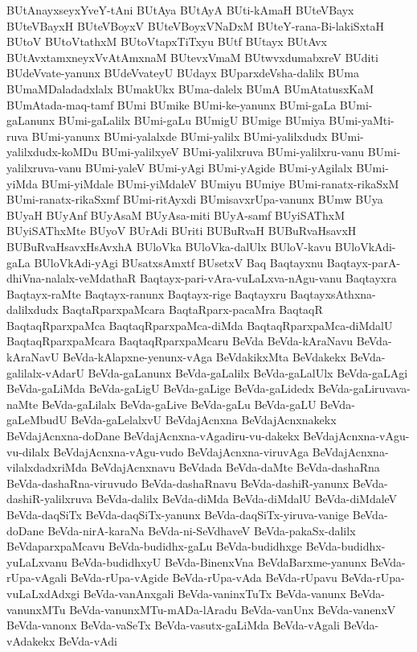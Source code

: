 {BUtAnayxseyxYveY-tAni
BUtAya
BUtAyA
BUti-kAmaH
BUteVBayx
BUteVBayxH
BUteVBoyxV
BUteVBoyxVNaDxM
BUteY-rana-Bi-lakiSxtaH
BUtoV
BUtoVtathxM
BUtoVtapxTiTxyu
BUtf
BUtayx
BUtAvx
BUtAvxtamxneyxVvAtAmxnaM
BUtevxVmaM
BUtwvxdumabxreV
BUditi
BUdeVvate-yanunx
BUdeVvateyU
BUdayx
BUparxdeVsha-dalilx
BUma
BUmaMDaladadxlalx
BUmakUkx
BUma-dalelx
BUmA
BUmAtatusxKaM
BUmAtada-maq-tamf
BUmi
BUmike
BUmi-ke-yanunx
BUmi-gaLa
BUmi-gaLanunx
BUmi-gaLalilx
BUmi-gaLu
BUmigU
BUmige
BUmiya
BUmi-yaMti-ruva
BUmi-yanunx
BUmi-yalalxde
BUmi-yalilx
BUmi-yalilxdudx
BUmi-yalilxdudx-koMDu
BUmi-yalilxyeV
BUmi-yalilxruva
BUmi-yalilxru-vanu
BUmi-yalilxruva-vanu
BUmi-yaleV
BUmi-yAgi
BUmi-yAgide
BUmi-yAgilalx
BUmi-yiMda
BUmi-yiMdale
BUmi-yiMdaleV
BUmiyu
BUmiye
BUmi-ranatx-rikaSxM
BUmi-ranatx-rikaSxmf
BUmi-ritAyxdi
BUmisavxrUpa-vanunx
BUmw
BUya
BUyaH
BUyAnf
BUyAsaM
BUyAsa-miti
BUyA-samf
BUyiSAThxM
BUyiSAThxMte
BUyoV
BUrAdi
BUriti
BUBuRvaH
BUBuRvaHsavxH
BUBuRvaHsavxHsAvxhA
BUloVka
BUloVka-dalUlx
BUloV-kavu
BUloVkAdi-gaLa
BUloVkAdi-yAgi
BUsatxsAmxtf
BUsetxV
Baq
Baqtayxnu
Baqtayx-parA-dhiVna-nalalx-veMdathaR
Baqtayx-pari-vAra-vuLaLxva-nAgu-vanu
Baqtayxra
Baqtayx-raMte
Baqtayx-ranunx
Baqtayx-rige
Baqtayxru
BaqtayxsAthxna-dalilxdudx
BaqtaRparxpaMcara
BaqtaRparx-pacaMra
BaqtaqR
BaqtaqRparxpaMca
BaqtaqRparxpaMca-diMda
BaqtaqRparxpaMca-diMdalU
BaqtaqRparxpaMcara
BaqtaqRparxpaMcaru
BeVda
BeVda-kAraNavu
BeVda-kAraNavU
BeVda-kAlapxne-yenunx-vAga
BeVdakikxMta
BeVdakekx
BeVda-galilalx-vAdarU
BeVda-gaLanunx
BeVda-gaLalilx
BeVda-gaLalUlx
BeVda-gaLAgi
BeVda-gaLiMda
BeVda-gaLigU
BeVda-gaLige
BeVda-gaLidedx
BeVda-gaLiruvava-naMte
BeVda-gaLilalx
BeVda-gaLive
BeVda-gaLu
BeVda-gaLU
BeVda-gaLeMbudU
BeVda-gaLelalxvU
BeVdajAcnxna
BeVdajAcnxnakekx
BeVdajAcnxna-doDane
BeVdajAcnxna-vAgadiru-vu-dakekx
BeVdajAcnxna-vAgu-vu-dilalx
BeVdajAcnxna-vAgu-vudo
BeVdajAcnxna-viruvAga
BeVdajAcnxna-vilalxdadxriMda
BeVdajAcnxnavu
BeVdada
BeVda-daMte
BeVda-dashaRna
BeVda-dashaRna-viruvudo
BeVda-dashaRnavu
BeVda-dashiR-yanunx
BeVda-dashiR-yalilxruva
BeVda-dalilx
BeVda-diMda
BeVda-diMdalU
BeVda-diMdaleV
BeVda-daqSiTx
BeVda-daqSiTx-yanunx
BeVda-daqSiTx-yiruva-vanige
BeVda-doDane
BeVda-nirA-karaNa
BeVda-ni-SeVdhaveV
BeVda-pakaSx-dalilx
BeVdaparxpaMcavu
BeVda-budidhx-gaLu
BeVda-budidhxge
BeVda-budidhx-yuLaLxvanu
BeVda-budidhxyU
BeVda-BinenxVna
BeVdaBarxme-yanunx
BeVda-rUpa-vAgali
BeVda-rUpa-vAgide
BeVda-rUpa-vAda
BeVda-rUpavu
BeVda-rUpa-vuLaLxdAdxgi
BeVda-vanAnxgali
BeVda-vaninxTuTx
BeVda-vanunx
BeVda-vanunxMTu
BeVda-vanunxMTu-mADa-lAradu
BeVda-vanUnx
BeVda-vanenxV
BeVda-vanonx
BeVda-vaSeTx
BeVda-vasutx-gaLiMda
BeVda-vAgali
BeVda-vAdakekx
BeVda-vAdi
}

